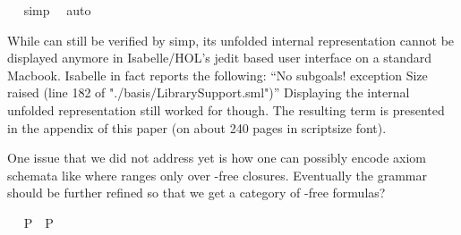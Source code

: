 \begin{isabellebody}
\isadelimproof
\ %
\endisadelimproof
%
\isatagproof
{}\isamarkupfalse%
\ simp\ \isamarkupfalse%
\ auto%
\endisatagproof
{\isafoldproof}%
%
\isadelimproof
%
\endisadelimproof
%
\isamarkuptrue%
%
\isamarkuptrue%
%
\begin{isamarkuptext}%
While  can still be verified by simp, 
  its unfolded internal representation cannot be displayed anymore in Isabelle/HOL's jedit based
  user interface on a
  standard Macbook. Isabelle in fact reports the following: 
     ``No subgoals! exception Size raised (line 182 of "./basis/LibrarySupport.sml")''
   Displaying the internal unfolded representation still worked 
  for  though. The resulting term is presented in the appendix 
  of this paper (on about 240 pages in scriptsize font).%
\end{isamarkuptext}\isamarkuptrue%
%
\isamarkuptrue%
%
\begin{isamarkuptext}%
One issue that we did not address yet is how one can possibly encode 
 axiom schemata like \isa{\isactrlbold {\isasymA}{\isasymphi}\ \isactrlbold {\isasymrightarrow}\ \isactrlbold {\isasymphi}} where \isa{\isactrlbold {\isasymphi}} ranges only 
 over \isa{\isactrlbold {\isasymbox}}-free closures. Eventually the grammar should be further refined so that we get a 
 category of \isa{\isactrlbold {\isasymbox}}-free formulas?%
\end{isamarkuptext}\isamarkuptrue%
\ \isamarkupfalse%
\ {\isachardoublequoteopen}{\isacharbrackleft}\isactrlbold {\isasymA}{\isasymphi}\isactrlsup P\ \isactrlbold {\isasymrightarrow}\ \isactrlbold {\isasymbox}{\isacharparenleft}\isactrlbold {\isasymA}{\isasymphi}\isactrlsup P{\isacharparenright}{\isacharbrackright}\ {\isacharequal}\ {\isasymtop}{\isachardoublequoteclose}%

\end{isabellebody}
